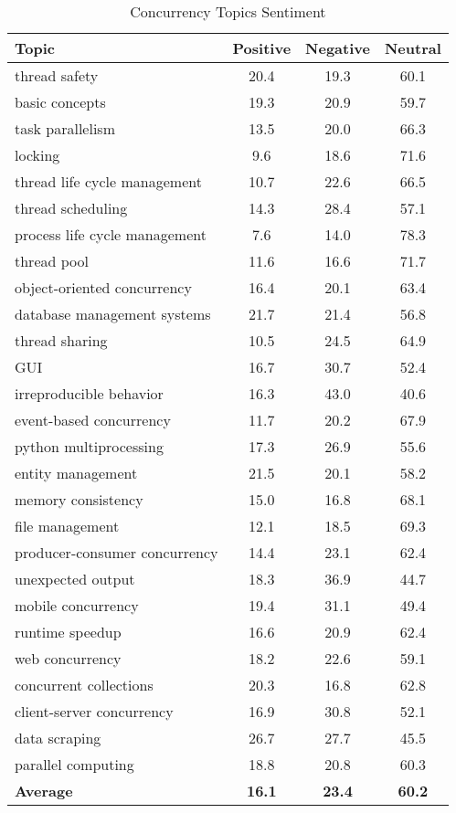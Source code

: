 \begin{table}[tbp]
\caption{Concurrency Topics Sentiment}
\label{tableSentiConcurrency}
\centering
\begin{tabular}{lccc} \hline
\textbf{Topic} & \textbf{Positive} & \textbf{Negative} & \textbf{Neutral} \\ \hline
thread safety & 20.4 & 19.3 & 60.1 \\ 
basic concepts & 19.3 & 20.9 & 59.7 \\ 
task parallelism & 13.5 & 20.0 & 66.3 \\
locking & 9.6 & 18.6 & 71.6 \\ 
thread life cycle management & 10.7 & 22.6 & 66.5 \\ 
thread scheduling & 14.3 & 28.4 & 57.1 \\ 
process life cycle management & 7.6 & 14.0 & 78.3 \\ 
thread pool & 11.6 & 16.6 & 71.7 \\
object-oriented concurrency & 16.4 & 20.1 & 63.4 \\ 
database management systems & 21.7 & 21.4 & 56.8 \\ 
thread sharing & 10.5 & 24.5 & 64.9 \\ 
GUI& 16.7 & 30.7 & 52.4 \\ 
irreproducible behavior & 16.3 & 43.0 & 40.6 \\ 
event-based concurrency & 11.7 & 20.2 & 67.9 \\ 
python multiprocessing & 17.3 & 26.9 & 55.6 \\ 
entity management & 21.5 & 20.1 & 58.2 \\ 
memory consistency & 15.0 & 16.8 & 68.1 \\ 
file management & 12.1 & 18.5 & 69.3 \\ 
producer-consumer concurrency & 14.4 & 23.1 & 62.4 \\ 
unexpected output & 18.3 & 36.9 & 44.7 \\ 
mobile concurrency & 19.4 & 31.1 & 49.4 \\ 
runtime speedup & 16.6 & 20.9 & 62.4 \\ 
web concurrency & 18.2 & 22.6 & 59.1 \\ 
concurrent collections & 20.3 & 16.8 & 62.8 \\ 
client-server concurrency & 16.9 & 30.8 & 52.1 \\ 
data scraping & 26.7 & 27.7 & 45.5 \\ 
parallel computing & 18.8 & 20.8 & 60.3 \\ \hline
\textbf{Average} & \textbf{16.1} & \textbf{23.4} & \textbf{60.2} \\ \hline
\end{tabular}
\end{table}


